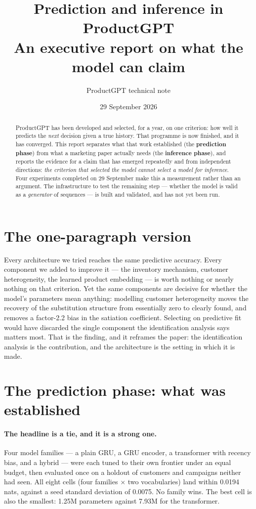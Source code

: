 \documentclass[11pt]{article}
\title{\textbf{Prediction and inference in ProductGPT}\\[2pt]
\large An executive report on what the model can claim}
\author{ProductGPT technical note}
\date{29 September 2026}
\begin{document}
\maketitle

\begin{abstract}
\noindent ProductGPT has been developed and selected, for a year, on one
criterion: how well it predicts the \emph{next} decision given a true history.
That programme is now finished, and it has converged. This report separates
what that work established (the \textbf{prediction phase}) from what a
marketing paper actually needs (the \textbf{inference phase}), and reports the
evidence for a claim that has emerged repeatedly and from independent
directions: \emph{the criterion that selected the model cannot select a model
for inference}. Four experiments completed on 29 September make this a
measurement rather than an argument. The infrastructure to test the remaining
step --- whether the model is valid as a \emph{generator} of sequences --- is
built and validated, and has not yet been run.
\end{abstract}

\section{The one-paragraph version}

Every architecture we tried reaches the same predictive accuracy. Every
component we added to improve it --- the inventory mechanism, customer
heterogeneity, the learned product embedding --- is worth nothing or nearly
nothing on that criterion. Yet the same components are decisive for whether the
model's parameters mean anything: modelling customer heterogeneity moves the
recovery of the substitution structure from essentially zero to clearly found,
and removes a factor-2.2 bias in the satiation coefficient. Selecting on
predictive fit would have discarded the single component the identification
analysis says matters most. That is the finding, and it reframes the paper:
the identification analysis is the contribution, and the architecture is the
setting in which it is made.

\section{The prediction phase: what was established}

\paragraph{The headline is a tie, and it is a strong one.} Four model families
--- a plain GRU, a GRU encoder, a transformer with recency bias, and a hybrid
--- were each tuned to their own frontier under an equal budget, then evaluated
once on a holdout of customers and campaigns neither had seen. All eight cells
(four families $\times$ two vocabularies) land within 0.0194 nats, against a
seed standard deviation of 0.0075. No family wins. The best cell is also the
smallest: 1.25M parameters against 7.93M for the transformer.
\end{document}
